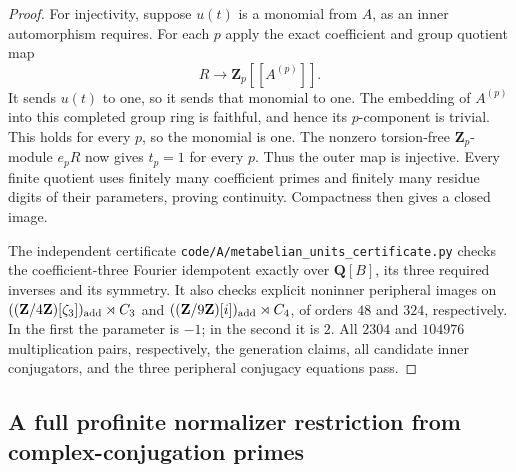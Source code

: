\begin{proof}
For injectivity, suppose $u(t)$ is a monomial from
$A$, as an inner automorphism requires. For each $p$
apply the exact coefficient and group quotient map
\[
 R\longrightarrow\mathbf Z_p[[A^{(p)}]].
\]
It sends $u(t)$ to one, so it sends that monomial to
one. The embedding of $A^{(p)}$ into this completed
group ring is faithful, and hence its $p$-component
is trivial. This holds for every $p$, so the monomial
is one. The nonzero torsion-free $\mathbf Z_p$-module
$e_pR$ now gives $t_p=1$ for every $p$. Thus the outer
map is injective. Every finite quotient uses finitely
many coefficient primes and finitely many residue
digits of their parameters, proving continuity.
Compactness then gives a closed image.

The independent certificate
\texttt{code/A/metabelian\_units\_certificate.py}
checks the coefficient-three Fourier idempotent
exactly over $\mathbf Q[B]$, its three required
inverses and its symmetry. It also checks explicit
noninner peripheral images on
$((\mathbf Z/4\mathbf Z)[\zeta_3])_{\rm add}\rtimes C_3$
and $((\mathbf Z/9\mathbf Z)[i])_{\rm add}\rtimes C_4$,
of orders $48$ and $324$, respectively. In the first
the parameter is $-1$; in the second it is $2$.
All $2304$ and $104976$ multiplication pairs, respectively,
the generation claims, all candidate inner conjugators,
and the three peripheral conjugacy equations pass.
\end{proof}

\subsection{A full profinite normalizer restriction from complex-conjugation primes}

